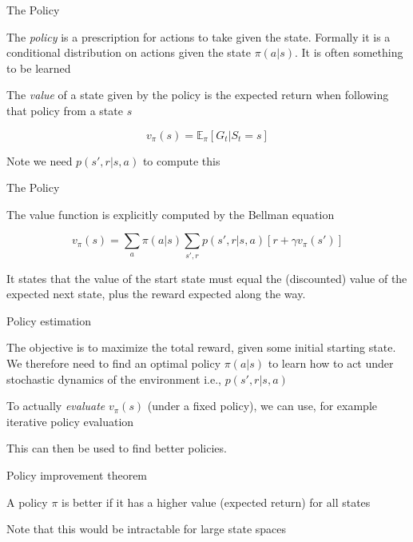 \documentclass{beamer}					%
\begin{document}
\begin{frame}{The Policy}

The \emph{policy} is a prescription for actions to take given the state. Formally it is a conditional distribution on actions given the state $\pi(a\lvert s)$. It is often something to be learned

\vspace{0.2in}

The \emph{value} of a state given by the policy is the expected return when following that policy from a state $s$

\begin{equation*}
v_{\pi}(s) = \mathbb{E}_{\pi} \left[ G_{t}\lvert S_{t}=s\right]
\end{equation*}

\vspace{0.2in}

Note we need $p(s',r\lvert s,a)$ to compute this

\end{frame}


\begin{frame}{The Policy}

The value function is explicitly computed by the Bellman equation

\begin{equation*}
v_{\pi}(s) = \sum_{a}\pi(a\lvert s) \sum_{s',r}p(s',r\lvert s,a)\left[r+\gamma v_{\pi}(s')\right]
\end{equation*}

\vspace{0.2in}

It states that the value of the start state must equal the
(discounted) value of the expected next state, plus the reward expected along the way.

\end{frame}

\begin{frame}{Policy estimation}

The objective is to maximize the total reward, given some initial starting state. We therefore need to find an optimal policy $\pi(a\lvert s)$ to learn how to act under stochastic dynamics of the environment i.e., $p(s',r\lvert s,a)$

\vspace{0.2in}

To actually \emph{evaluate} $v_{\pi}(s)$ (under a fixed policy), we can use, for example iterative policy evaluation

\vspace{0.2in}

This can then be used to find better policies. 

\end{frame}


\begin{frame}{Policy improvement theorem}

A policy $\pi$ is better if it has a higher value (expected return) for all states

Note that this would be intractable for large state spaces

\end{frame}
\end{document}
